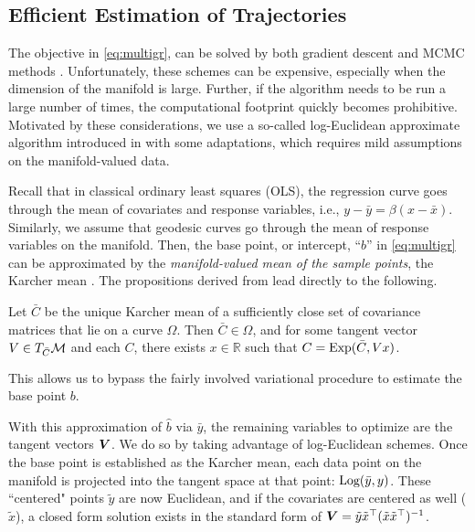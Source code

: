 \subsection{Efficient Estimation of Trajectories}
\label{sec:effest}
The objective in \eqref{eq:multigr}, can be solved by both gradient descent \citep{fletcher2013geodesic,hjkimcvpr2014} and MCMC methods \citep{cornea2016regression}. 
Unfortunately, these schemes can be expensive, especially when the dimension of the manifold is large. Further, if the algorithm needs to be run a 
large number of times, the computational footprint quickly becomes prohibitive. 
Motivated by these considerations, we use a so-called log-Euclidean approximate algorithm introduced in \cite{hjkimcvpr2014} with some adaptations, which requires mild assumptions on the manifold-valued data. 

Recall that in classical ordinary least squares (OLS), 
the regression curve goes through the mean of covariates and response variables, i.e., $y-\bar{y} = \beta(x-\bar{x})$.
Similarly, we assume that geodesic curves go through the mean of response variables on the manifold. Then, the base point, or intercept, ``$b$'' in \eqref{eq:multigr} can be approximated by the {\em manifold-valued mean of the sample points}, the Karcher mean \citep{karcher1977riemannian}. The propositions derived from \citep{hjkimcvpr2014} lead directly to the following. 
\begin{proposition}
Let $\bar{C}$ be the unique Karcher mean of a sufficiently close set of covariance matrices that lie on a curve $\Omega$. Then $\bar{C} \in \Omega$, and for some tangent vector $V \in T_{\bar{C}}\mathcal{M}$ and each $C$, there exists $x \in \mathbb{R}$ such that $C = \text{Exp}(\bar{C},Vx)$. 	
\end{proposition}
This allows us to bypass the fairly involved variational procedure to estimate the base point $b$.

With this approximation of $\hat{b}$ via $\bar{y}$, the remaining variables to optimize are the tangent vectors $\bm{V}$. 
We do so by taking advantage of log-Euclidean schemes. Once the base point is established as the Karcher mean, each data point on the manifold is projected into the tangent space at that point: $\text{Log}(\bar{y},y)$. These ``centered" points $\tilde{y}$ are now Euclidean, and if the covariates are centered as well ($\tilde{x}$), a closed form solution exists in the standard form of $\bm{V} = \tilde{y}\tilde{x}^\top (\tilde{x}\tilde{x}^\top)^{-1}$. 

